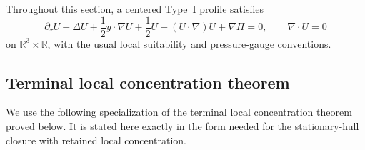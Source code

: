 \documentclass[11pt]{amsart}
\numberwithin{equation}{section}
\theoremstyle{plain}
\theoremstyle{definition}
\theoremstyle{remark}
\begin{document}
Throughout this section, a centered Type~I profile satisfies
\begin{equation}\label{eq:R3S-centered}
   \partial_\tau U-\Delta U+\frac12 y\cdot\nabla U+\frac12 U
   +(U\cdot\nabla)U+\nabla \Pi=0,
   \qquad \nabla\cdot U=0
\end{equation}
on \(\mathbb R^3\times\mathbb R\), with the usual local suitability and
pressure-gauge conventions.

\subsection{Terminal local concentration theorem}

We use the following specialization of the terminal local concentration theorem
proved below.  It is stated here exactly in the form needed for the
stationary-hull closure with retained local concentration.
\end{document}
